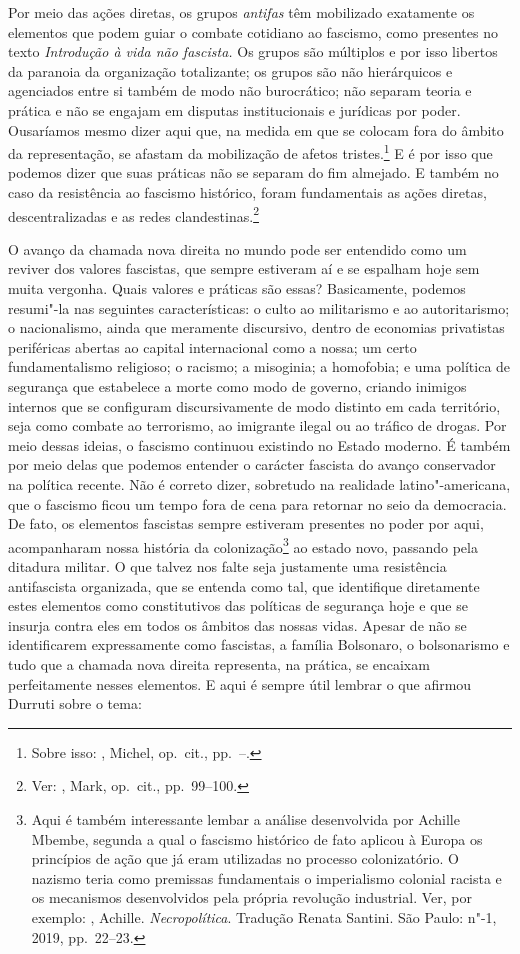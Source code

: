 Por meio das ações diretas, os grupos \emph{antifas} têm mobilizado
exatamente os elementos que podem guiar o combate cotidiano ao fascismo,
como presentes no texto \emph{Introdução à vida não fascista.} Os
grupos são múltiplos e por isso libertos da paranoia da organização
totalizante; os grupos são não hierárquicos e agenciados entre si também
de modo não burocrático; não separam teoria e prática e não se engajam
em disputas institucionais e jurídicas por poder. Ousaríamos mesmo dizer
aqui que, na medida em que se colocam fora do âmbito da representação,
se afastam da mobilização de afetos tristes.\footnote{Sobre isso:
  , Michel, op.~cit., pp.~--.} E é por isso que podemos dizer que suas
práticas não se separam do fim almejado. E também no caso da resistência
ao fascismo histórico, foram fundamentais as ações diretas,
descentralizadas e as redes clandestinas.\footnote{Ver: , Mark, op.~cit., pp.~99--100.}

O avanço da chamada nova direita no mundo pode ser entendido como um
reviver dos valores fascistas, que sempre estiveram aí e se espalham
hoje sem muita vergonha. Quais valores e práticas são essas?
Basicamente, podemos resumi"-la nas seguintes características: o culto ao
militarismo e ao autoritarismo; o nacionalismo, ainda que meramente
discursivo, dentro de economias privatistas periféricas abertas ao
capital internacional como a nossa; um certo fundamentalismo religioso;
o racismo; a misoginia; a homofobia; e uma política de segurança que
estabelece a morte como modo de governo, criando inimigos internos que se
configuram discursivamente de modo distinto em cada território, seja como
combate ao terrorismo, ao imigrante ilegal ou ao tráfico de drogas. Por
meio dessas ideias, o fascismo continuou existindo no Estado moderno. É
também por meio delas que podemos entender o carácter fascista do avanço
conservador na política recente. Não é correto dizer, sobretudo na
realidade latino"-americana, que o fascismo ficou um tempo fora de cena
para retornar no seio da democracia. De fato, os elementos fascistas
sempre estiveram presentes no poder por aqui, acompanharam nossa
história da colonização\footnote{Aqui é também interessante lembar a
  análise desenvolvida por Achille Mbembe, segunda a qual o fascismo
  histórico de fato aplicou à Europa os princípios de ação que já eram
  utilizadas no processo colonizatório. O nazismo teria como premissas
  fundamentais o imperialismo colonial racista e os mecanismos
  desenvolvidos pela própria revolução industrial. Ver, por exemplo:
  , Achille. \emph{Necropolítica}. Tradução Renata Santini. São Paulo:
  n"-1, 2019, pp.~22--23.} ao estado novo, passando pela ditadura militar.
O que talvez nos falte seja justamente uma resistência antifascista
organizada, que se entenda como tal, que identifique diretamente estes
elementos como constitutivos das políticas de segurança hoje e que se
insurja contra eles em todos os âmbitos das nossas vidas. Apesar de não
se identificarem expressamente como fascistas, a família Bolsonaro, o
bolsonarismo e tudo que a chamada nova direita representa, na
prática, se encaixam perfeitamente nesses elementos. E aqui é sempre
útil lembrar o que afirmou Durruti sobre o tema:

